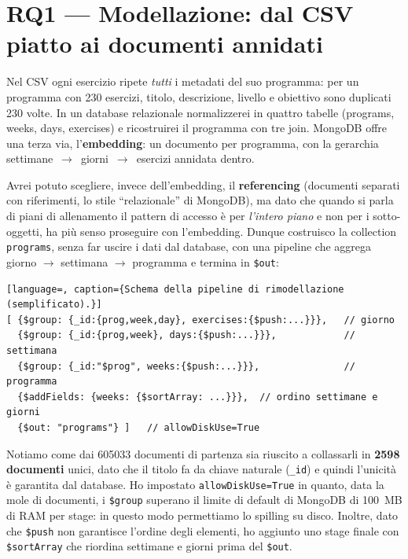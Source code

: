 \documentclass{article}
\begin{document}
\section{RQ1 --- Modellazione: dal CSV piatto ai documenti annidati}
\label{sec:rq1}

Nel CSV ogni esercizio ripete \emph{tutti} i metadati del suo programma: per un
programma con 230 esercizi, titolo, descrizione, livello e obiettivo sono
duplicati 230 volte. In un database relazionale normalizzerei in quattro tabelle
(programs, weeks, days, exercises) e ricostruirei il programma con tre join.
MongoDB offre una terza via, l'\textbf{embedding}: un documento per programma, con
la gerarchia settimane~$\rightarrow$~giorni~$\rightarrow$~esercizi annidata dentro.

Avrei potuto scegliere, invece dell'embedding, il \textbf{referencing} (documenti
separati con riferimenti, lo stile ``relazionale'' di MongoDB), ma dato che quando
si parla di piani di allenamento il pattern di accesso è per \emph{l'intero piano}
e non per i sotto-oggetti, ha più senso proseguire con l'embedding. Dunque
costruisco la collection \texttt{programs}, senza far uscire i dati dal database,
con una pipeline che aggrega giorno $\rightarrow$ settimana $\rightarrow$ programma
e termina in \texttt{\$out}:

\begin{lstlisting}[language=, caption={Schema della pipeline di rimodellazione (semplificato).}]
[ {$group: {_id:{prog,week,day}, exercises:{$push:...}}},   // giorno
  {$group: {_id:{prog,week}, days:{$push:...}}},            // settimana
  {$group: {_id:"$prog", weeks:{$push:...}}},               // programma
  {$addFields: {weeks: {$sortArray: ...}}},  // ordino settimane e giorni
  {$out: "programs"} ]   // allowDiskUse=True
\end{lstlisting}

Notiamo come dai \num{605033} documenti di partenza sia riuscito a collassarli in
\textbf{\num{2598} documenti} unici, dato che il titolo fa da chiave naturale
(\texttt{\_id}) e quindi l'unicità è garantita dal database. Ho impostato
\texttt{allowDiskUse=True} in quanto, data la mole di documenti, i \texttt{\$group}
superano il limite di default di MongoDB di 100~MB di RAM per stage: in questo modo
permettiamo lo spilling su disco. Inoltre, dato che \texttt{\$push} non garantisce
l'ordine degli elementi, ho aggiunto uno stage finale con \texttt{\$sortArray} che
riordina settimane e giorni prima del \texttt{\$out}.
\end{document}
